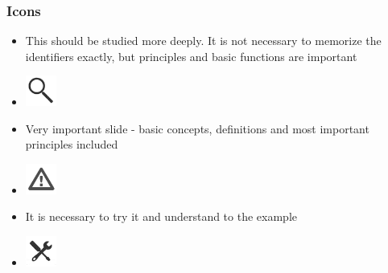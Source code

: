 \documentclass[10pt,xcolor=pdflatex]{beamer}
\begin{document}
\begin{frame}\frametitle{Icons}
  \begin{itemize}
    \item This should be studied more deeply. It is not necessary to memorize the identifiers exactly, but principles and basic functions are important
    \item[] \includegraphics[width=1cm]{img/lupa}
    \item Very important slide - basic concepts, definitions and most important principles included
    \item[] \includegraphics[width=1cm]{img/pozor}
    \item It is necessary to try it and understand to the example
    \item[] \includegraphics[width=1cm]{img/naradi}
  \end{itemize}
\end{frame}


\end{document}
